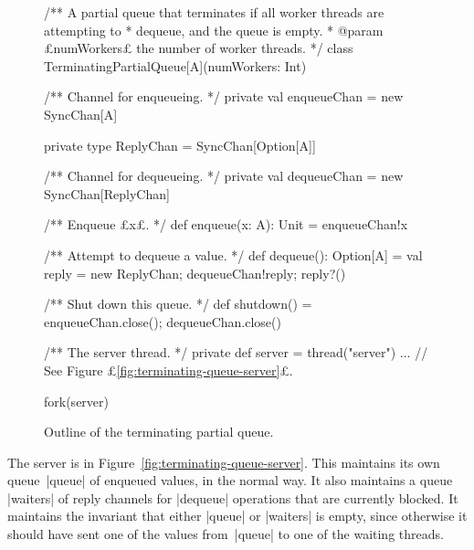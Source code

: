 \begin{figure}
\begin{scala}
/** A partial queue that terminates if all worker threads are attempting to
  * dequeue, and the queue is empty.
  * @param £numWorkers£ the number of worker threads. */
class TerminatingPartialQueue[A](numWorkers: Int){
  /** Channel for enqueueing. */
  private val enqueueChan = new SyncChan[A]

  private type ReplyChan = SyncChan[Option[A]]

  /** Channel for dequeueing. */
  private val dequeueChan = new SyncChan[ReplyChan]

  /** Enqueue £x£. */
  def enqueue(x: A): Unit = enqueueChan!x

  /** Attempt to dequeue a value. */
  def dequeue(): Option[A] = {
    val reply = new ReplyChan; dequeueChan!reply; reply?()
  }

  /** Shut down this queue. */
  def shutdown() = { enqueueChan.close(); dequeueChan.close() }

  /** The server thread. */
  private def server = thread("server"){ ... } // See Figure £\ref{fig:terminating-queue-server}£.

  fork(server)
}
\end{scala}
\caption{Outline of the terminating partial queue.}
\label{fig:terminating-queue}
\end{figure}



The server is in Figure~\ref{fig:terminating-queue-server}.  This maintains
its own queue~|queue| of enqueued values, in the normal way.  It also
maintains a queue |waiters| of reply channels for |dequeue| operations that
are currently blocked.  It maintains the invariant that either |queue| or
|waiters| is empty, since otherwise it should have sent one of the values
from~|queue| to one of the waiting threads.  


